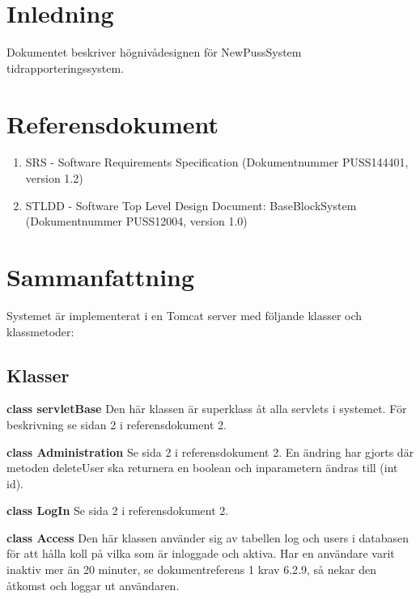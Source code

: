 \documentclass[a4paper]{article}
\begin{document}
\section{Inledning}       
Dokumentet beskriver högnivådesignen för NewPussSystem tidrapporteringssystem.


\section{Referensdokument}
\begin{enumerate}
\item SRS - Software Requirements Specification (Dokumentnummer PUSS144401, version 1.2)
\item STLDD - Software Top Level Design Document: BaseBlockSystem (Dokumentnummer PUSS12004, version 1.0)
\end{enumerate}



\section{Sammanfattning}
Systemet är implementerat i en Tomcat server med följande klasser och klassmetoder:

\subsection{Klasser}
\begin{hangparas}{1.5em}{1}
\textbf{class servletBase} Den här klassen är superklass åt alla servlets i systemet. För beskrivning se sidan 2 i referensdokument 2.
\end{hangparas} 

\vspace{5mm}
\begin{hangparas}{1.5em}{1}
\textbf{class Administration} Se sida 2 i referensdokument 2. En ändring har gjorts där metoden deleteUser ska returnera en boolean och inparametern ändras till (int id).
\end{hangparas}

\vspace{5mm}
\begin{hangparas}{1.5em}{1}
\textbf{class LogIn} Se sida 2 i referensdokument 2.
\end{hangparas}

\vspace{5mm}
\begin{hangparas}{1.5em}{1}
\textbf{class Access} Den här klassen använder sig av tabellen log och users i databasen för att hålla koll på vilka som är inloggade och aktiva. Har en användare varit inaktiv mer än 20 minuter, se dokumentreferens 1 krav 6.2.9, så nekar den åtkomst och loggar ut användaren. \end{hangparas}
\end{document}
